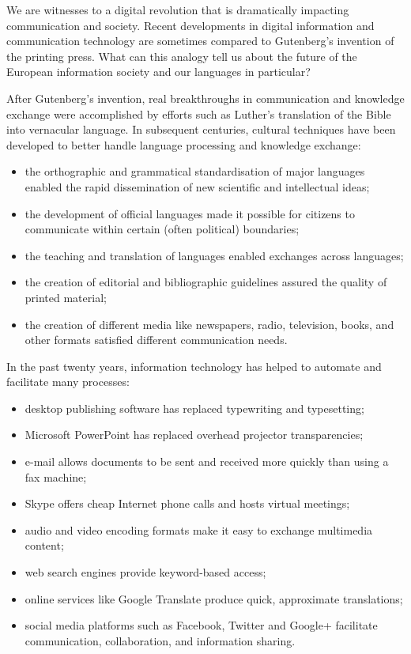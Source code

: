 \begin{multicols}{2}

We are witnesses to a digital revolution that is dramatically impacting communication and society. Recent developments in digital information and communication technology are sometimes compared to Gutenberg’s invention of the printing press. What can this analogy tell us about the future of the European information society and our languages in particular?


 After Gutenberg’s invention, real breakthroughs in communication and knowledge exchange were accomplished by efforts such as Luther’s translation of the Bible into vernacular language. In subsequent centuries, cultural techniques have been developed to better handle language processing and knowledge exchange:

\begin{itemize}
\item the orthographic and grammatical standardisation of major languages enabled the rapid dissemination of new scientific and intellectual ideas;
\item the development of official languages made it possible for citizens to communicate within certain (often political) boundaries;
\item the teaching and translation of languages enabled exchanges across languages;
\item the creation of editorial and bibliographic guidelines assured the quality of printed material;
\item the creation of different media like newspapers, radio, television, books, and other formats satisfied different communication needs. 
\end{itemize}

In the past twenty years, information technology has helped to automate and facilitate many processes:

\begin{itemize}
\item desktop publishing software has replaced typewriting and typesetting;
\item Microsoft PowerPoint has replaced overhead projector transparencies;
\item e-mail allows documents to be sent and received more quickly than using a fax machine;
\item Skype offers cheap Internet phone calls and hosts virtual meetings;
\item audio and video encoding formats make it easy to exchange multimedia content;
\item web search engines provide keyword-based access;
\item online services like Google Translate produce quick, approximate translations;
\item social media platforms such as Facebook, Twitter and Google+ facilitate communication, collaboration, and information sharing.
\end{itemize}


\end{multicols}
